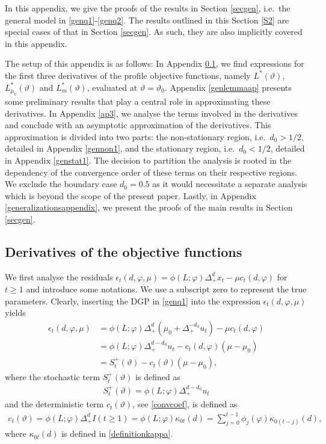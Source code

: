 {{In this appendix, we give the proofs of the results in Section \ref{secgen}, i.e.\ the general model in \eqref{genq1}-\eqref{genq2}. The results outlined in this Section \ref{S2} are special cases of that in Section \ref{secgen}. As such, they are also implicitly covered in this appendix. 

The setup of this appendix is as follows: In Appendix \ref{generalderivgen}, we find expressions for the first three derivatives of the profile objective functions, namely $L^*(\vartheta)$, $L_{\mu_0}^*(\vartheta)$ and
$L_{m}^*(\vartheta)$, evaluated at $\vartheta = \vartheta_0$. Appendix \ref{genlemmaap} presents some preliminary results that play a central role in approximating these derivatives. In Appendix \ref{ap3}, we analyse the terms involved in the derivatives and conclude with an asymptotic approximation of the derivatives. This approximation is divided into two parts: the non-stationary region, i.e.\ $d_0 > 1/2$, detailed in Appendix \ref{gennon1}, and the stationary region, i.e.\ $d_0 < 1/2$,
detailed in Appendix \ref{genstat1}. The decision to partition the analysis is rooted in the dependency of the convergence order of these terms on their respective regions. We
exclude the boundary case $d_0 = 0.5$ as it would necessitate a separate analysis which is beyond the scope of the present paper. Lastly, in Appendix \ref{generalizationsappendix}, we present the proofs of the main results in Section \ref{secgen}.


\subsection{Derivatives of the objective functions} \label{generalderivgen}

We first analyse the residuals $\epsilon_t(d, \varphi, \mu) = \phi(L;\varphi)\Delta_{+}^{d} x_t- \mu c_t(d,\varphi)$  for $t \geq 1$ and introduce some notations. We use a subscript zero to represent the true parameters. Clearly, inserting the DGP in \eqref{genq1} into the expression $\epsilon_t(d, \varphi, \mu)$ yields
\begin{align}
    \epsilon_t(d, \varphi, \mu) &= \phi(L;\varphi)\Delta_{+}^{d}(\mu_0 + \Delta_+^{-d_0} u_t) - \mu c_{t}(d,\varphi) \nonumber \\
    &= \phi(L;\varphi)\Delta_{+}^{d-d_0} u_t - c_{t}(d,\varphi) \left( \mu - \mu_0 \right) \nonumber \\
    &= S^+_t(\vartheta)  - c_{t}(\vartheta) \left( \mu - \mu_0 \right), \label{GenRDEF} 
\end{align}
where the stochastic term $S^+_t(\vartheta)$ is defined as 
\begin{align}
    S^+_t(\vartheta) = \phi(L;\varphi)\Delta_{+}^{d-d_0} u_t \label{Sterm}
\end{align}
and the deterministic term $c_{t}(\vartheta)$, see \eqref{convcoef}, is defined as 
\begin{align}
 c_{t}(\vartheta) = \phi(L;\varphi)\Delta_{+}^{d} I(t \geq 1) = \phi(L;\varphi) \kappa_{0t}(d) = \sum_{j = 0}^{t-1} \phi_j(\varphi) \kappa_{0(t-j)}(d),  \label{detc}
\end{align}
where $\kappa_{0t}(d)$ is defined in \eqref{definitionkappa}. 


}}
